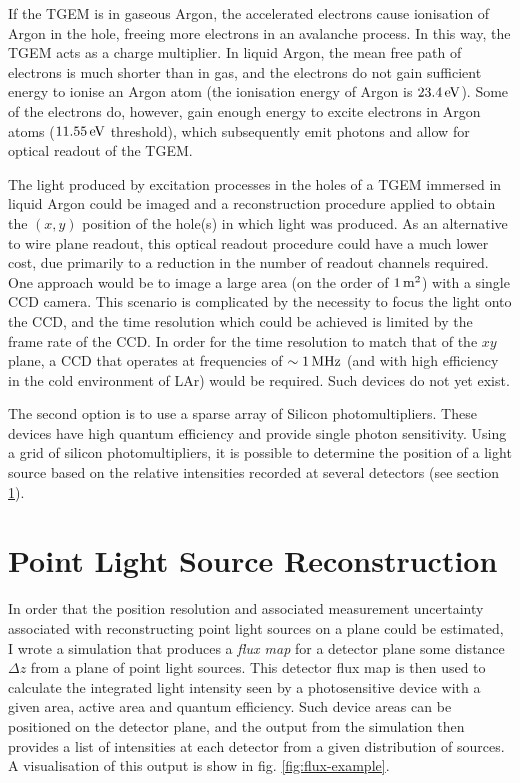 If the \ac{TGEM} is in gaseous Argon, the accelerated electrons cause ionisation of Argon in the hole, freeing more electrons in an avalanche process. In this way, the \ac{TGEM} acts as a charge multiplier. In liquid Argon, the mean free path of electrons is much shorter than in gas, and the electrons do not gain sufficient energy to ionise an Argon atom (the ionisation energy of Argon is $23.4\eV$\citep{Aprile2006}). Some of the electrons do, however, gain enough energy to excite electrons in Argon atoms ($11.55\eV$ threshold\citep{Stewart2010}), which subsequently emit photons and allow for optical readout of the \ac{TGEM}\citep{Lightfoot2009}.

The light produced by excitation processes in the holes of a \ac{TGEM} immersed in liquid Argon could be imaged and a reconstruction procedure applied to obtain the $(x,y)$ position of the hole(s) in which light was produced. As an alternative to wire plane readout, this optical readout procedure could have a much lower cost, due primarily to a reduction in the number of readout channels required. One approach would be to image a large area (on the order of $1 \metre^2$) with a single \ac{CCD} camera. This scenario is complicated by the necessity to focus the light onto the \ac{CCD}, and the time resolution which could be achieved is limited by the frame rate of the \ac{CCD}. In order for the time resolution to match that of the $xy$ plane, a \ac{CCD} that operates at frequencies of $\sim 1\MHz$ (and with high efficiency in the cold environment of \ac{LAr}) would be required. Such devices do not yet exist.

The second option is to use a sparse array of Silicon photomultipliers. These devices have high quantum efficiency and provide single photon sensitivity. Using a grid of silicon photomultipliers, it is possible to determine the position of a light source based on the relative intensities recorded at several detectors (see section \ref{sec:point-source-recon}).

\section{Point Light Source Reconstruction}\label{sec:point-source-recon}
In order that the position resolution and associated measurement uncertainty associated with reconstructing point light sources on a plane could be estimated, I wrote a simulation that produces a \emph{flux map} for a detector plane some distance $\Delta z$ from a plane of point light sources. This detector flux map is then used to calculate the integrated light intensity seen by a photosensitive device with a given area, active area and quantum efficiency. Such device areas can be positioned on the detector plane, and the output from the simulation then provides a list of intensities at each detector from a given distribution of sources. A visualisation of this output is show in fig. \ref{fig:flux-example}.

